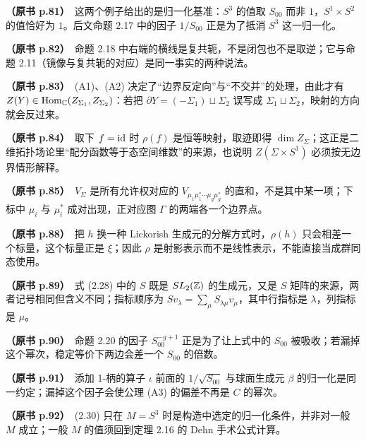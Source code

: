 \noindent \textbf{（原书 p.81）}\ 这两个例子给出的是归一化基准：$S^3$ 的值取 $S_{00}$ 而非 $1$，$S^1\times S^2$ 的值恰好为 $1$。后文命题 2.17 中的因子 $1/S_{00}$ 正是为了抵消 $S^3$ 这一归一化。\par\smallskip

\noindent \textbf{（原书 p.82）}\ 命题 2.18 中右端的横线是复共轭，不是闭包也不是取逆；它与命题 2.11（镜像与复共轭的对应）是同一事实的两种说法。\par\smallskip

\noindent \textbf{（原书 p.83）}\ (A1)、(A2) 决定了“边界反定向”与“不交并”的处理，由此才有 $Z(Y)\in\operatorname{Hom}_{\mathbb{C}}(Z_{\Sigma_1},Z_{\Sigma_2})$：若把 $\partial Y=(-\Sigma_1)\sqcup\Sigma_2$ 误写成 $\Sigma_1\sqcup\Sigma_2$，映射的方向就会反过来。\par\smallskip

\noindent \textbf{（原书 p.84）}\ 取下 $f=\mathrm{id}$ 时 $\rho(f)$ 是恒等映射，取迹即得 $\dim Z_\Sigma$；这正是二维拓扑场论里“配分函数等于态空间维数”的来源，也说明 $Z(\Sigma\times S^1)$ 必须按无边界情形解释。\par\smallskip

\noindent \textbf{（原书 p.85）}\ $V_\Sigma$ 是所有允许权对应的 $V_{\mu_1\mu_1^*\cdots\mu_g\mu_g^*}$ 的直和，不是其中某一项；下标中 $\mu_i$ 与 $\mu_i^*$ 成对出现，正对应图 $\Gamma$ 的两端各一个边界点。\par\smallskip

\noindent \textbf{（原书 p.88）}\ 把 $h$ 换一种 Lickorish 生成元的分解方式时，$\rho(h)$ 只会相差一个标量，这个标量正是 $\xi$；因此 $\rho$ 是射影表示而不是线性表示，不能直接当成群同态使用。\par\smallskip

\noindent \textbf{（原书 p.89）}\ 式 (2.28) 中的 $S$ 既是 $SL_2(\mathbb{Z})$ 的生成元，又是 $S$ 矩阵的来源，两者记号相同但含义不同；指标顺序为 $S v_\lambda=\sum_\mu S_{\lambda\mu}v_\mu$，其中行指标是 $\lambda$，列指标是 $\mu$。\par\smallskip

\noindent \textbf{（原书 p.90）}\ 命题 2.20 的因子 $S_{00}^{-g+1}$ 正是为了让上式中的 $S_{00}$ 被吸收；若漏掉这个幂次，稳定等价下两边会差一个 $S_{00}$ 的倍数。\par\smallskip

\noindent \textbf{（原书 p.91）}\ 添加 1-柄的算子 $\iota$ 前面的 $1/\sqrt{S_{00}}$ 与球面生成元 $\beta$ 的归一化是同一约定；漏掉这个因子会使公理 (A3) 的偏差不再是 $C$ 的幂次。\par\smallskip

\noindent \textbf{（原书 p.92）}\ (2.30) 只在 $M=S^3$ 时是构造中选定的归一化条件，并非对一般 $M$ 成立；一般 $M$ 的值须回到定理 2.16 的 Dehn 手术公式计算。\par\smallskip

